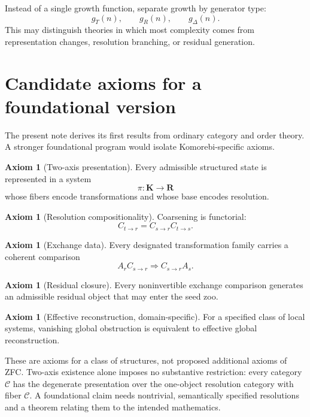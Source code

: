\documentclass[11pt]{article}
\theoremstyle{definition}
\newtheorem{axiom}[theorem]{Axiom}
\theoremstyle{remark}
\newcommand{\K}{\mathbf K}
\newcommand{\Rcat}{\mathbf R}
\begin{document}
Instead of a single growth function, separate growth by generator type:
\[
g_T(n),\qquad g_R(n),\qquad g_\Delta(n).
\]
This may distinguish theories in which most complexity comes from representation changes, resolution branching, or residual generation.

\section{Candidate axioms for a foundational version}

The present note derives its first results from ordinary category and order theory. A stronger foundational program would isolate Komorebi-specific axioms.

\begin{axiom}[Two-axis presentation]
Every admissible structured state is represented in a system
\[
\pi:\K\to\Rcat
\]
whose fibers encode transformations and whose base encodes resolution.
\end{axiom}

\begin{axiom}[Resolution compositionality]
Coarsening is functorial:
\[
C_{t\to r}=C_{s\to r}C_{t\to s}.
\]
\end{axiom}

\begin{axiom}[Exchange data]
Every designated transformation family carries a coherent comparison
\[
A_rC_{s\to r}\Longrightarrow C_{s\to r}A_s.
\]
\end{axiom}

\begin{axiom}[Residual closure]
Every noninvertible exchange comparison generates an admissible residual object that may enter the seed zoo.
\end{axiom}

\begin{axiom}[Effective reconstruction, domain-specific]
For a specified class of local systems, vanishing global obstruction is equivalent to effective global reconstruction.
\end{axiom}

These are axioms for a class of structures, not proposed additional axioms of ZFC. Two-axis existence alone imposes no substantive restriction: every category $\mathcal C$ has the degenerate presentation over the one-object resolution category with fiber $\mathcal C$. A foundational claim needs nontrivial, semantically specified resolutions and a theorem relating them to the intended mathematics.
\end{document}
